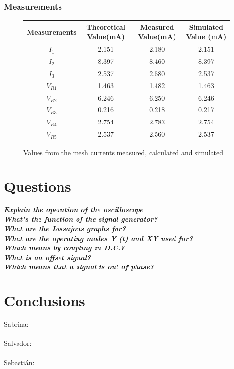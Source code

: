 \documentclass[letterpaper]{article}
\begin{document}
\subsubsection{Measurements}
\begin{figure}[H]
    \centering
    \begin{tabular}{|c|c|c|c|}\hline
        Measurements & Theoretical Value(\si{\milli\ampere}) & Measured Value(\si{\milli\ampere}) &
        Simulated Value (\si{\milli\ampere})\\\hline
        $I_{1}$ & 2.151 & 2.180 & 2.151 \\\hline
        $I_{2}$ & 8.397 & 8.460 & 8.397 \\\hline
        $I_{3}$ & 2.537 & 2.580 & 2.537 \\\hline
        $V_{R1}$ & 1.463 & 1.482 & 1.463 \\\hline 
        $V_{R2}$ & 6.246 & 6.250 & 6.246 \\\hline 
        $V_{R3}$ & 0.216 & 0.218 & 0.217 \\\hline 
        $V_{R4}$ & 2.754 & 2.783 & 2.754 \\\hline 
        $V_{R5}$ & 2.537 & 2.560 & 2.537 \\\hline 
    \end{tabular}
    \caption{Values from the mesh currents measured, calculated and simulated}
\end{figure}
\section{Questions}
\textit{\textbf{Explain the operation of the oscilloscope}}\\
\textit{\textbf{What's the function of the signal generator?}}\\
\textit{\textbf{What are the Lissajous graphs for?}}\\
\textit{\textbf{What are the operating modes Y (t) and XY used for?}}\\
\textit{\textbf{Which means by coupling in D.C.?}}\\
\textit{\textbf{What is an offset signal?}}\\
\textit{\textbf{Which means that a signal is out of phase?}}\\
\section{Conclusions}
{\large Sabrina:}\\
%
\\[2ex]
{\large Salvador:}\\
%
\\[2ex]
{\large Sebastián:}\\
\end{document}
